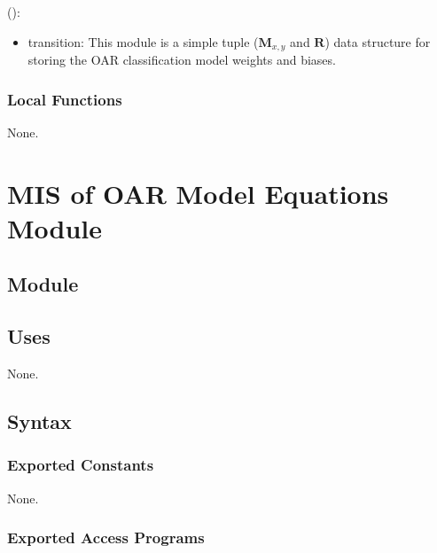 \documentclass[12pt, titlepage]{article}
\begin{document}
\noindent {}():
\begin{itemize}
\item transition: This module is a simple tuple ($\mathbf{M}_{x,y}$ and $\mathbf{R}$) data structure for storing the OAR classification model weights and biases.
\end{itemize}

\subsubsection{Local Functions}

None.

\section{MIS of OAR Model Equations Module} \label{ModuleOME} 

\subsection{Module}


\subsection{Uses}

None.

\subsection{Syntax}

\subsubsection{Exported Constants}

None.

\subsubsection{Exported Access Programs}
\end{document}
